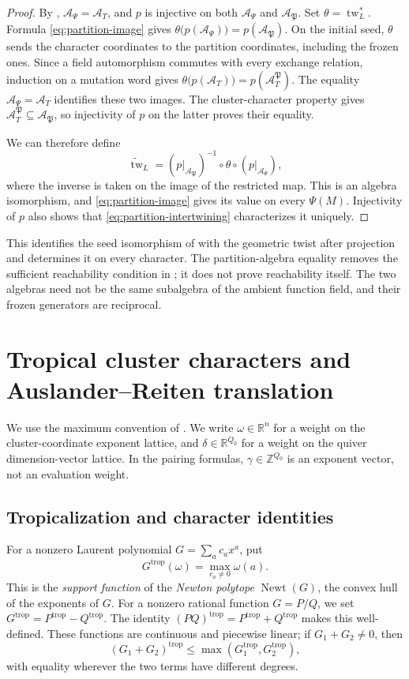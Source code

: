 \documentclass[11pt]{amsart}
\numberwithin{equation}{section}
\theoremstyle{definition}
\theoremstyle{remark}
\newcommand{\op}[1]{\operatorname{#1}}
\newcommand{\ZZ}{\mathbb Z}
\newcommand{\tw}{\op{tw}}
\newcommand{\RR}{\mathbb R}
\newcommand{\Newt}{\op{Newt}}
\begin{document}
\begin{proof}
By \cite[Theorem~7.9]{JRS26}, $\mathscr A_\Psi=\mathcal A_T$, and
$p$ is injective on both $\mathscr A_\Psi$ and
$\mathscr A_{\mathfrak P}$. Set $\theta=\tw_L^*$. Formula
\eqref{eq:partition-image} gives
$\theta\bigl(p(\mathscr A_\Psi)\bigr)=p(\mathscr A_{\mathfrak P})$.
On the initial seed, $\theta$ sends the character coordinates to the
partition coordinates, including the frozen ones. Since a field
automorphism commutes with every exchange relation, induction on a
mutation word gives
$\theta\bigl(p(\mathcal A_T)\bigr)=p(\mathcal A_T^{\mathfrak P})$. 
The equality $\mathscr A_\Psi=\mathcal A_T$ identifies these two
images. The cluster-character property gives
$\mathcal A_T^{\mathfrak P}\subseteq\mathscr A_{\mathfrak P}$, so
injectivity of $p$ on the latter proves their equality.

We can therefore define
\[ \widetilde{\tw}_L=(p|_{\mathscr A_{\mathfrak P}})^{-1}\circ\theta\circ(p|_{\mathscr A_\Psi}), \]
where the inverse is taken on the image of the restricted map.
This is an algebra isomorphism, and \eqref{eq:partition-image} gives
its value on every $\Psi(M)$. Injectivity of $p$ also shows that
\eqref{eq:partition-intertwining} characterizes it uniquely.
\end{proof}

This identifies the seed isomorphism of \cite[Theorem~7.9]{JRS26}
with the geometric twist after projection and determines it on every
character. The partition-algebra equality removes the sufficient
reachability condition in \cite[Remark~7.13]{JRS26}; it does not prove
reachability itself. The two algebras need not be the same subalgebra
of the ambient function field, and their frozen generators are reciprocal.

\section{Tropical cluster characters and Auslander--Reiten translation}\label{sec:tropical}

We use the maximum convention of \cite[Sections~3.1 and 6.2]{FeiT23}.
We write $\omega\in\RR^n$ for a weight on the cluster-coordinate
exponent lattice, and $\delta\in\RR^{Q_0}$ for a weight on the
quiver dimension-vector lattice. In the pairing formulas,
$\gamma\in\ZZ^{Q_0}$ is an exponent vector, not an evaluation weight.

\subsection{Tropicalization and character identities}
For a nonzero Laurent polynomial $G=\sum_a c_ax^a$, put
\[ G^{\mathrm{trop}}(\omega)=\max_{c_a\ne0}\omega(a). \]
This is the \emph{support function} of the \emph{Newton polytope}
$\Newt(G)$, the convex hull of the exponents of $G$. For a nonzero rational
function $G=P/Q$, we set
$G^{\mathrm{trop}}=P^{\mathrm{trop}}-Q^{\mathrm{trop}}$.
The identity
$(PQ)^{\mathrm{trop}}=P^{\mathrm{trop}}+Q^{\mathrm{trop}}$
makes this well-defined. These functions are
continuous and piecewise linear; if $G_1+G_2\ne0$, then
\[ (G_1+G_2)^{\mathrm{trop}}\leq\max(G_1^{\mathrm{trop}},G_2^{\mathrm{trop}}), \]
with equality wherever the two terms have different degrees.
\end{document}
